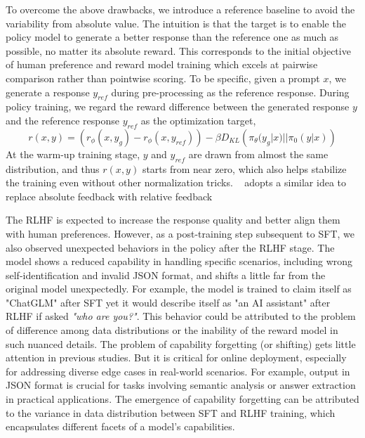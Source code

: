 To overcome the above drawbacks, we introduce a reference baseline to avoid the variability from absolute value. The intuition is that the target is to enable the policy model to generate a better response than the reference one as much as possible, no matter its absolute reward. This corresponds to the initial objective of human preference and reward model training which excels at pairwise comparison rather than pointwise scoring.
To be specific, given a prompt $x$, we generate a response $y_{ref}$ during pre-processing as the reference response. During policy training, we regard the reward difference between the generated response $y$ and the reference response $y_{ref}$ as the optimization target,
\begin{equation}
    r(x, y) = \left(r_\phi(x, y_g) - r_\phi(x, y_{ref})\right) - \beta D_{KL}\left(\pi_{\theta}(y_g|x) || \pi_{0}(y|x)\right)
\end{equation}
At the warm-up training stage, $y$ and $y_{ref}$ are drawn from almost the same distribution, and thus $r(x,y)$ starts from near zero, which also helps stabilize the training even without other normalization tricks. ~\cite{wu2023pairwise} adopts a similar idea to replace absolute feedback with relative feedback

The RLHF is expected to increase the response quality and better align them with human preferences. However, as a post-training step subsequent to SFT, we also observed unexpected behaviors in the policy after the RLHF stage. The model shows a reduced capability in handling specific scenarios, including wrong self-identification and invalid JSON format, and shifts a little far from the original model unexpectedly.
For example, the model is trained to claim itself as "ChatGLM" after SFT yet it would describe itself as "an AI assistant" after RLHF if asked \textit{"who are you?"}.
This behavior could be 
attributed to the problem of difference among data distributions or the inability of the reward model in such nuanced details. 
The problem of capability forgetting (or shifting) gets little attention in previous studies. 
But it is critical for online deployment,  especially for addressing diverse edge cases in real-world scenarios. 
For example, output in JSON format is crucial for tasks involving semantic analysis or answer extraction in practical applications. The emergence of capability forgetting can be attributed to the variance in data distribution between SFT and RLHF training, which encapsulates different facets of a model's capabilities.


